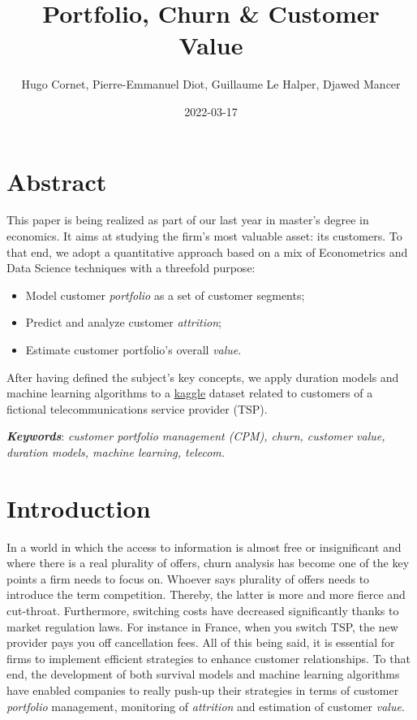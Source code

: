 \documentclass[
]{book}
\title{Portfolio, Churn \& Customer Value}
\author{Hugo Cornet, Pierre-Emmanuel Diot, Guillaume Le Halper, Djawed Mancer}
\date{2022-03-17}
\providecommand{\tightlist}{%
  \setlength{\itemsep}{0pt}\setlength{\parskip}{0pt}}
\begin{document}
\maketitle

{
\setcounter{tocdepth}{1}
\tableofcontents
}
\hypertarget{abstract}{%
\chapter*{Abstract}\label{abstract}}

This paper is being realized as part of our last year in master's degree in economics. It aims at studying the firm's most valuable asset: its customers. To that end, we adopt a quantitative approach based on a mix of Econometrics and Data Science techniques with a threefold purpose:

\begin{itemize}
\tightlist
\item
  Model customer \emph{portfolio} as a set of customer segments;
\item
  Predict and analyze customer \emph{attrition};
\item
  Estimate customer portfolio's overall \emph{value}.
\end{itemize}

After having defined the subject's key concepts, we apply duration models and machine learning algorithms to a \href{https://www.kaggle.com/yeanzc/telco-customer-churn-ibm-dataset}{kaggle} dataset related to customers of a fictional telecommunications service provider (TSP).

\textbf{\emph{Keywords}}: \emph{customer portfolio management (CPM), churn, customer value, duration models, machine learning, telecom.}

\hypertarget{intro}{%
\chapter{Introduction}\label{intro}}

In a world in which the access to information is almost free or insignificant and where there is a real plurality of offers, churn analysis has become one of the key points a firm needs to focus on. Whoever says plurality of offers needs to introduce the term competition. Thereby, the latter is more and more fierce and cut-throat. Furthermore, switching costs have decreased significantly thanks to market regulation laws. For instance in France, when you switch TSP, the new provider pays you off cancellation fees. All of this being said, it is essential for firms to implement efficient strategies to enhance customer relationships. To that end, the development of both survival models and machine learning algorithms have enabled companies to really push-up their strategies in terms of customer \emph{portfolio} management, monitoring of \emph{attrition} and estimation of customer \emph{value}.
\end{document}

